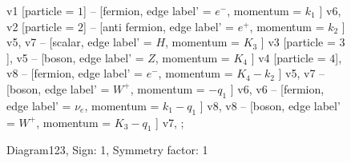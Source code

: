 \documentclass{revtex4}
\begin{document}
\begin{figure}[!htb]
\begin{center}
{    %
v1 [particle = \(1\)] -- [fermion, edge label' = \(e^{-}\), momentum = \(k_{1}\) ] v6, 
v2 [particle = \(2\)] -- [anti fermion, edge label' = \(e^{+}\), momentum = \(k_{2}\) ] v5, 
v7 -- [scalar, edge label' = \(H\), momentum = \(K_{3}\) ] v3 [particle = \(3\)], 
v5 -- [boson, edge label' = \(Z\), momentum = \(K_{4}\) ] v4 [particle = \(4\)], 
v8 -- [fermion, edge label' = \(e^{-}\), momentum = \(K_{4} - k_{2}\) ] v5, 
v7 -- [boson, edge label' = \(W^{+}\), momentum = \(-q_{1}\) ] v6, 
v6 -- [fermion, edge label' = \(\nu_{e}\), momentum = \(k_{1} - q_{1}\) ] v8, 
v8 -- [boson, edge label' = \(W^{+}\), momentum = \(K_{3} - q_{1}\) ] v7, 
};
\end{center}
\caption{Diagram123, Sign: 1, Symmetry factor: 1}
\end{figure}
\newpage
\end{document}
